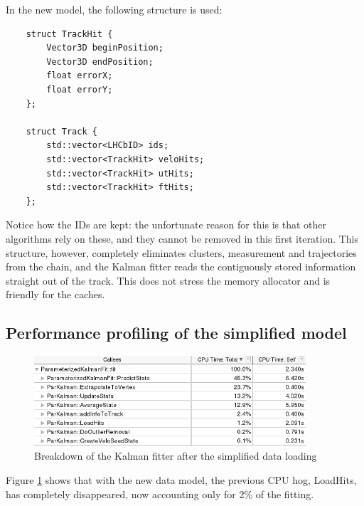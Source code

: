 \documentclass[12pt]{article}
\begin{document}
In the new model, the following structure is used:
\begin{lstlisting}
	struct TrackHit {
		Vector3D beginPosition;
		Vector3D endPosition;
		float errorX;
		float errorY;
	};
	
	struct Track {
		std::vector<LHCbID> ids;
		std::vector<TrackHit> veloHits;
		std::vector<TrackHit> utHits;
		std::vector<TrackHit> ftHits;
	};
\end{lstlisting}

Notice how the IDs are kept: the unfortunate reason for this is that other algorithms rely on these, and they cannot be removed in this first iteration. This structure, however, completely eliminates clusters, measurement and trajectories from the chain, and the Kalman fitter reads the contiguously stored information straight out of the track. This does not stress the memory allocator and is friendly for the caches.


\subsection{Performance profiling of the simplified model}


\begin{figure}[H]
	\begin{center}
		\includegraphics[width=0.9\textwidth]{kalmanfit_simplified_overall_breakdown}
	\end{center}
	\caption{Breakdown of the Kalman fitter after the simplified data loading}
	\label{fig_kalmanfit_simplified_overall_breakdown}
\end{figure}

Figure \ref{fig_kalmanfit_simplified_overall_breakdown} shows that with the new data model, the previous CPU hog, LoadHits, has completely disappeared, now accounting only for 2\% of the fitting.
\end{document}
